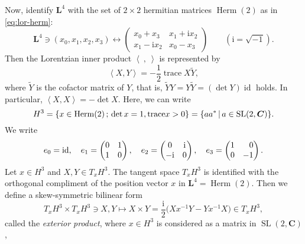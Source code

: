 \documentclass[a4paper]{amsart}
\theoremstyle{plain}
\theoremstyle{remark}
\numberwithin{equation}{section}
\begin{document}
Now, identify  ${\boldsymbol{L}}^4$ with the set of $2\times 2$ hermitian matrices
${\operatorname{Herm}}(2)$ as in \eqref{eq:lor-herm}:
\[
   {\boldsymbol{L}}^4\ni (x_0,x_1,x_2,x_3) \longleftrightarrow
   \begin{pmatrix}
     x_0 + x_ 3 & x_1 + {\mathrm{i}} x_2 \\
     x_1 - {\mathrm{i}} x_2  & x_0 - x_3
   \end{pmatrix}
   \qquad \left({\mathrm{i}}=\sqrt{-1}\right).
\]
Then the Lorentzian inner product ${\left\langle{{~}},{{~}}\right\rangle}$ is represented by  
\begin{equation*}
     {\left\langle{{X}},{{Y}}\right\rangle} = -\frac{1}{2}{\operatorname{trace}} X\widetilde Y,
\end{equation*}
where $\widetilde Y$ is the cofactor matrix of $Y$,
that is,  $\widetilde Y Y=Y \widetilde Y =(\det{Y}) {\operatorname{id}}$ holds.
In particular, ${\left\langle{{X}},{{X}}\right\rangle} = -\det X$.
Here, we can write
\begin{equation}\label{eq:herm-hyp}
  H^3 = \{x\in {\operatorname{Herm}}(2)\,;\,\det x=1,{\operatorname{trace}} x>0\}\\
=\{aa^*\,|\,a\in{\operatorname{SL}}(2,{\boldsymbol{C}})\}.
\end{equation}
We write
\begin{equation}\label{eq:pauli}
   e_0={\operatorname{id}},\quad
   e_1=\begin{pmatrix}
	 0 & 1 \\ 1 & 0 
       \end{pmatrix},\quad
   e_2=\begin{pmatrix}
	 0 & {\mathrm{i}} \\ -{\mathrm{i}} & 0 
       \end{pmatrix},\quad
   e_3=\begin{pmatrix} 1 & \hphantom{-}0 \\ 0 & -1\end{pmatrix}.
\end{equation}
Let $x\in H^3$ and $X,Y\in T_xH^3$. 
The tangent space $T_xH^3$ is identified with the orthogonal 
compliment of the position vector $x$ in ${\boldsymbol{L}}^4={\operatorname{Herm}}(2)$. 
Then we define a skew-symmetric bilinear form
\begin{equation}\label{eq:exterior}
T_xH^3\times T_xH^3\ni X,Y \mapsto
  X\times Y = \frac{\mathrm{i}}{2}\bigl(Xx^{-1}Y-Yx^{-1}X\bigr)\in T_xH^3,
\end{equation}
called the {\em exterior product\/},
where $x\in H^3$ is considered as a matrix in ${\operatorname{SL}}(2,{\boldsymbol{C}})$,
\end{document}
